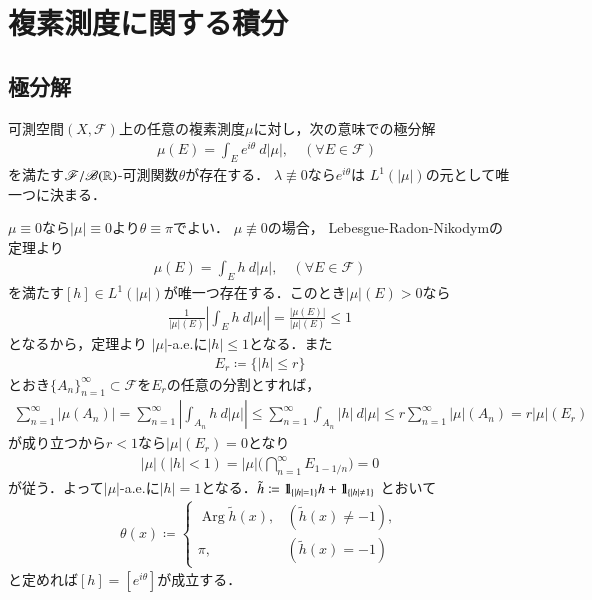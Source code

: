 \section{複素測度に関する積分}
\subsection{極分解}
	\begin{screen}
		\begin{thm}[複素測度の極分解]\label{thm:polar_decomposition_of_complex_measures}
			可測空間$(X,\mathscr{F})$上の任意の複素測度$\mu$に対し，次の意味での極分解
			\begin{align}
				\quad \mu(E) = \int_E e^{i\theta}\ d|\mu|,
				\quad (\forall E \in \mathscr{F})
			\end{align}
			を満たす$\mathscr{F}/\mathscr{B}(\mathbb{R})$-可測関数$\theta$が存在する．
			$\lambda \not\equiv 0$なら$e^{i \theta}$は
			$L^1(|\mu|)$の元として唯一つに決まる．
		\end{thm}
	\end{screen}
	
	\begin{prf} $\mu \equiv 0$なら$|\mu| \equiv 0$より$\theta \equiv \pi$でよい．
		$\mu \not\equiv 0$の場合，
		Lebesgue-Radon-Nikodymの定理より
		\begin{align}
			\mu(E) = \int_E h\ d|\mu|,
			\quad (\forall E \in \mathscr{F})
		\end{align}
		を満たす$[h] \in L^1(|\mu|)$が唯一つ存在する．このとき$|\mu|(E) > 0$なら
		\begin{align}
			\frac{1}{|\mu|(E)} \left| \int_E h\ d|\mu| \right|
			= \frac{|\mu(E)|}{|\mu|(E)} \leq 1
		\end{align}
		となるから，定理より
		$|\mu|$-a.e.に$|h| \leq 1$となる．また
		\begin{align}
			E_r \coloneqq \{|h| \leq r\}
		\end{align}
		とおき$\{A_n\}_{n=1}^\infty \subset \mathscr{F}$を$E_r$の任意の分割とすれば，
		\begin{align}
			\sum_{n=1}^\infty |\mu(A_n)|
			= \sum_{n=1}^\infty \left|\int_{A_n} h\ d|\mu|\right|
			\leq \sum_{n=1}^\infty \int_{A_n} |h|\ d|\mu|
			\leq r \sum_{n=1}^\infty |\mu|(A_n)
			= r |\mu|(E_r)
		\end{align}
		が成り立つから$r < 1$なら$|\mu|(E_r) = 0$となり
		\begin{align}
			|\mu|\left(|h|< 1 \right)
			= |\mu| \Biggl(\bigcap_{n=1}^\infty E_{1-1/n} \Biggr)
			= 0
		\end{align}
		が従う．よって$|\mu|$-a.e.に$|h|=1$となる．$\tilde{h} \coloneqq \mbox{1}\hspace{-0.25em}\mbox{l}_{\{|h|=1\}}h + \mbox{1}\hspace{-0.25em}\mbox{l}_{\{|h|\neq1\}}$
		とおいて
		\begin{align}
			\theta(x) \coloneqq
			\begin{cases}
				\operatorname{Arg} \tilde{h}(x), & (\tilde{h}(x) \neq -1), \\
				\pi, & (\tilde{h}(x) = -1)
			\end{cases}
		\end{align}
		と定めれば$[h] = [e^{i \theta}]$が成立する．
		\QED
	\end{prf}
	
